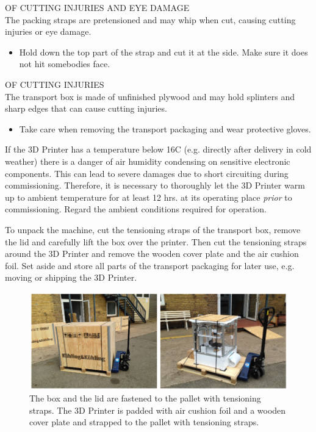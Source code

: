 \begin{danger}
  OF CUTTING INJURIES AND EYE DAMAGE\\
  The packing straps are pretensioned and may whip when cut, causing cutting injuries or eye damage.
  \begin{itemize}
    \item Hold down the top part of the strap and cut it at the side. Make sure it does not hit somebodies face.
  \end{itemize}
\end{danger}

\begin{danger}
  OF CUTTING INJURIES\\
  The transport box is made of unfinished plywood and may hold splinters and sharp edges that can cause cutting injuries.
  \begin{itemize}
    \item Take care when removing the transport packaging and wear protective gloves.
  \end{itemize}
\end{danger}

\begin{notice}
  If the 3D Printer has a temperature below 16\degree C (e.g. directly after delivery in cold weather) there is a danger of air humidity condensing on sensitive electronic components. This can lead to severe damages due to short circuiting during commissioning.
  Therefore, it is necessary to thoroughly let the 3D Printer warm up to ambient temperature for at least 12 hrs. at its operating place 
  \emph{prior} to commissioning.
  Regard the ambient conditions required for operation.  
\end{notice}

To unpack the machine, cut the tensioning straps of the transport box, remove the lid and carefully lift the box over the printer.
Then cut the tensioning straps around the 3D Printer and remove the wooden cover plate and the air cushion foil.
Set aside and store all parts of the transport packaging for later use, e.g. moving or shipping the 3D Printer. 

\begin{figure}[H]
  \centering
  \includegraphics[width=.7\linewidth]{./img/secure_boxed.png}
  \caption{The box and the lid are fastened to the pallet with tensioning straps.
           The 3D Printer is padded with air cushion foil and a wooden cover plate and strapped to the pallet with tensioning straps.}
\end{figure}

